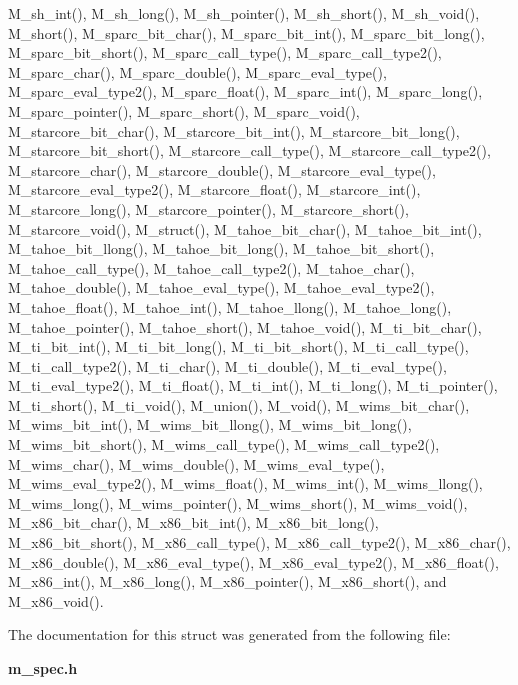 M\_\-sh\_\-int(), M\_\-sh\_\-long(), M\_\-sh\_\-pointer(), M\_\-sh\_\-short(), M\_\-sh\_\-void(), M\_\-short(), M\_\-sparc\_\-bit\_\-char(), M\_\-sparc\_\-bit\_\-int(), M\_\-sparc\_\-bit\_\-long(), M\_\-sparc\_\-bit\_\-short(), M\_\-sparc\_\-call\_\-type(), M\_\-sparc\_\-call\_\-type2(), M\_\-sparc\_\-char(), M\_\-sparc\_\-double(), M\_\-sparc\_\-eval\_\-type(), M\_\-sparc\_\-eval\_\-type2(), M\_\-sparc\_\-float(), M\_\-sparc\_\-int(), M\_\-sparc\_\-long(), M\_\-sparc\_\-pointer(), M\_\-sparc\_\-short(), M\_\-sparc\_\-void(), M\_\-starcore\_\-bit\_\-char(), M\_\-starcore\_\-bit\_\-int(), M\_\-starcore\_\-bit\_\-long(), M\_\-starcore\_\-bit\_\-short(), M\_\-starcore\_\-call\_\-type(), M\_\-starcore\_\-call\_\-type2(), M\_\-starcore\_\-char(), M\_\-starcore\_\-double(), M\_\-starcore\_\-eval\_\-type(), M\_\-starcore\_\-eval\_\-type2(), M\_\-starcore\_\-float(), M\_\-starcore\_\-int(), M\_\-starcore\_\-long(), M\_\-starcore\_\-pointer(), M\_\-starcore\_\-short(), M\_\-starcore\_\-void(), M\_\-struct(), M\_\-tahoe\_\-bit\_\-char(), M\_\-tahoe\_\-bit\_\-int(), M\_\-tahoe\_\-bit\_\-llong(), M\_\-tahoe\_\-bit\_\-long(), M\_\-tahoe\_\-bit\_\-short(), M\_\-tahoe\_\-call\_\-type(), M\_\-tahoe\_\-call\_\-type2(), M\_\-tahoe\_\-char(), M\_\-tahoe\_\-double(), M\_\-tahoe\_\-eval\_\-type(), M\_\-tahoe\_\-eval\_\-type2(), M\_\-tahoe\_\-float(), M\_\-tahoe\_\-int(), M\_\-tahoe\_\-llong(), M\_\-tahoe\_\-long(), M\_\-tahoe\_\-pointer(), M\_\-tahoe\_\-short(), M\_\-tahoe\_\-void(), M\_\-ti\_\-bit\_\-char(), M\_\-ti\_\-bit\_\-int(), M\_\-ti\_\-bit\_\-long(), M\_\-ti\_\-bit\_\-short(), M\_\-ti\_\-call\_\-type(), M\_\-ti\_\-call\_\-type2(), M\_\-ti\_\-char(), M\_\-ti\_\-double(), M\_\-ti\_\-eval\_\-type(), M\_\-ti\_\-eval\_\-type2(), M\_\-ti\_\-float(), M\_\-ti\_\-int(), M\_\-ti\_\-long(), M\_\-ti\_\-pointer(), M\_\-ti\_\-short(), M\_\-ti\_\-void(), M\_\-union(), M\_\-void(), M\_\-wims\_\-bit\_\-char(), M\_\-wims\_\-bit\_\-int(), M\_\-wims\_\-bit\_\-llong(), M\_\-wims\_\-bit\_\-long(), M\_\-wims\_\-bit\_\-short(), M\_\-wims\_\-call\_\-type(), M\_\-wims\_\-call\_\-type2(), M\_\-wims\_\-char(), M\_\-wims\_\-double(), M\_\-wims\_\-eval\_\-type(), M\_\-wims\_\-eval\_\-type2(), M\_\-wims\_\-float(), M\_\-wims\_\-int(), M\_\-wims\_\-llong(), M\_\-wims\_\-long(), M\_\-wims\_\-pointer(), M\_\-wims\_\-short(), M\_\-wims\_\-void(), M\_\-x86\_\-bit\_\-char(), M\_\-x86\_\-bit\_\-int(), M\_\-x86\_\-bit\_\-long(), M\_\-x86\_\-bit\_\-short(), M\_\-x86\_\-call\_\-type(), M\_\-x86\_\-call\_\-type2(), M\_\-x86\_\-char(), M\_\-x86\_\-double(), M\_\-x86\_\-eval\_\-type(), M\_\-x86\_\-eval\_\-type2(), M\_\-x86\_\-float(), M\_\-x86\_\-int(), M\_\-x86\_\-long(), M\_\-x86\_\-pointer(), M\_\-x86\_\-short(), and M\_\-x86\_\-void().

The documentation for this struct was generated from the following file:\begin{CompactItemize}
\item 
\bf{m\_\-spec.h}\end{CompactItemize}
